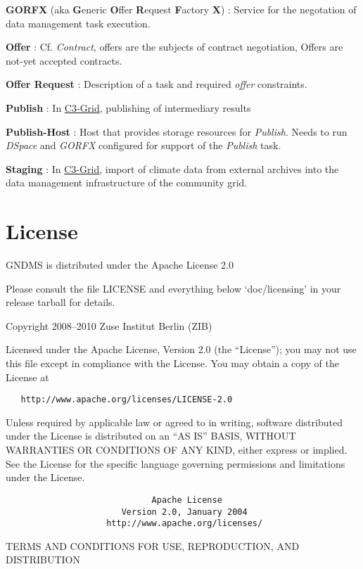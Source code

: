 \documentclass{article}
\begin{document}
\textbf{GORFX} (aka \textbf{G}eneric \textbf{O}ffer
\textbf{R}equest \textbf{F}actory \textbf{X}) : Service for the
negotation of data management task execution.

\textbf{Offer} : Cf. \emph{Contract}, offers are the subjects of
contract negotiation, Offers are not-yet accepted contracts.

\textbf{Offer Request} : Description of a task and required
\emph{offer} constraints.

\textbf{Publish} : In \href{http://www.c3grid.de}{C3-Grid},
publishing of intermediary results

\textbf{Publish-Host} : Host that provides storage resources for
\emph{Publish}. Needs to run \emph{DSpace} and \emph{GORFX}
configured for support of the \emph{Publish} task.

\textbf{Staging} : In \href{http://www.c3grid.de}{C3-Grid}, import
of climate data from external archives into the data management
infrastructure of the community grid.


\section{License}

GNDMS is distributed under the Apache License 2.0

Please consult the file LICENSE and everything below
`doc/licensing' in your release tarball for details.

Copyright 2008--2010 Zuse Institut Berlin (ZIB)

Licensed under the Apache License, Version 2.0 (the ``License'');
you may not use this file except in compliance with the License.
You may obtain a copy of the License at

\begin{verbatim}
   http://www.apache.org/licenses/LICENSE-2.0
\end{verbatim}
Unless required by applicable law or agreed to in writing, software
distributed under the License is distributed on an ``AS IS'' BASIS,
WITHOUT WARRANTIES OR CONDITIONS OF ANY KIND, either express or
implied. See the License for the specific language governing
permissions and limitations under the License.

\begin{verbatim}
                             Apache License
                       Version 2.0, January 2004
                    http://www.apache.org/licenses/
\end{verbatim}
TERMS AND CONDITIONS FOR USE, REPRODUCTION, AND DISTRIBUTION
\end{document}
